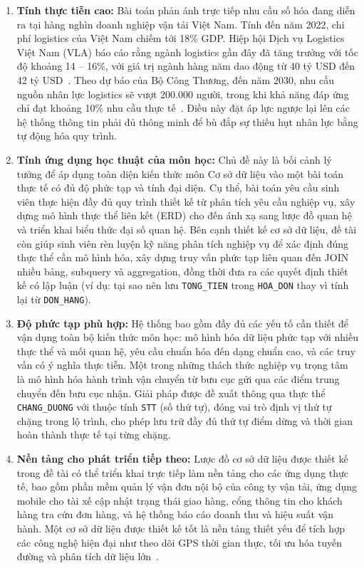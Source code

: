 \documentclass[11pt]{report}
\begin{document}
\begin{enumerate}
    \item \textbf{Tính thực tiễn cao:} Bài toán phản ánh trực tiếp nhu cầu số hóa đang diễn ra tại hàng nghìn doanh nghiệp vận tải Việt Nam. Tính đến năm 2022, chi phí logistics của Việt Nam chiếm tới 18\% GDP. Hiệp hội Dịch vụ Logistics Việt Nam (VLA) báo cáo rằng ngành logistics gần đây đã tăng trưởng với tốc độ khoảng 14 -- 16\%, với giá trị ngành hàng năm dao động từ 40 tỷ USD đến 42 tỷ USD~\cite{researchmarkets2024vietnam}. Theo dự báo của Bộ Công Thương, đến năm 2030, nhu cầu nguồn nhân lực logistics sẽ vượt 200.000 người, trong khi khả năng đáp ứng chỉ đạt khoảng 10\% nhu cầu thực tế~\cite{tapchicongthuong2020nhanluclogistics}. Điều này đặt áp lực ngược lại lên các hệ thống thông tin phải đủ thông minh để bù đắp sự thiếu hụt nhân lực bằng tự động hóa quy trình.
    
    \item \textbf{Tính ứng dụng học thuật của môn học:} Chủ đề này là bối cảnh lý tưởng để áp dụng toàn diện kiến thức môn Cơ sở dữ liệu vào một bài toán thực tế có đủ độ phức tạp và tính đại diện. Cụ thể, bài toán yêu cầu sinh viên thực hiện đầy đủ quy trình thiết kế từ phân tích yêu cầu nghiệp vụ, xây dựng mô hình thực thể liên kết (ERD) cho đến ánh xạ sang lược đồ quan hệ và triển khai biểu thức đại số quan hệ. Bên cạnh thiết kế cơ sở dữ liệu, đề tài còn giúp sinh viên rèn luyện kỹ năng phân tích nghiệp vụ để xác định đúng thực thể cần mô hình hóa, xây dựng truy vấn phức tạp liên quan đến JOIN nhiều bảng, subquery và aggregation, đồng thời đưa ra các quyết định thiết kế có lập luận (ví dụ: tại sao nên lưu \texttt{TONG\_TIEN} trong \texttt{HOA\_DON} thay vì tính lại từ \texttt{DON\_HANG}).

    \item \textbf{Độ phức tạp phù hợp:} Hệ thống bao gồm đầy đủ các yếu tố cần thiết để vận dụng toàn bộ kiến thức môn học: mô hình hóa dữ liệu phức tạp với nhiều thực thể và mối quan hệ, yêu cầu chuẩn hóa đến dạng chuẩn cao, và các truy vấn có ý nghĩa thực tiễn. Một trong những thách thức nghiệp vụ trọng tâm là mô hình hóa hành trình vận chuyển từ bưu cục gửi qua các điểm trung chuyển đến bưu cục nhận. Giải pháp được đề xuất thông qua thực thể \texttt{CHANG\_DUONG} với thuộc tính \texttt{STT} (số thứ tự), đóng vai trò định vị thứ tự chặng trong lộ trình, cho phép lưu trữ đầy đủ thứ tự điểm dừng và thời gian hoàn thành thực tế tại từng chặng.

    \item \textbf{Nền tảng cho phát triển tiếp theo:} Lược đồ cơ sở dữ liệu được thiết kế trong đề tài có thể triển khai trực tiếp làm nền tảng cho các ứng dụng thực tế, bao gồm phần mềm quản lý vận đơn nội bộ của công ty vận tải, ứng dụng mobile cho tài xế cập nhật trạng thái giao hàng, cổng thông tin cho khách hàng tra cứu đơn hàng, và hệ thống báo cáo doanh thu và hiệu suất vận hành. Một cơ sở dữ liệu được thiết kế tốt là nền tảng thiết yếu để tích hợp các công nghệ hiện đại như theo dõi GPS thời gian thực, tối ưu hóa tuyến đường và phân tích dữ liệu lớn~\cite{ieee2019transport}.
\end{enumerate}
\end{document}
